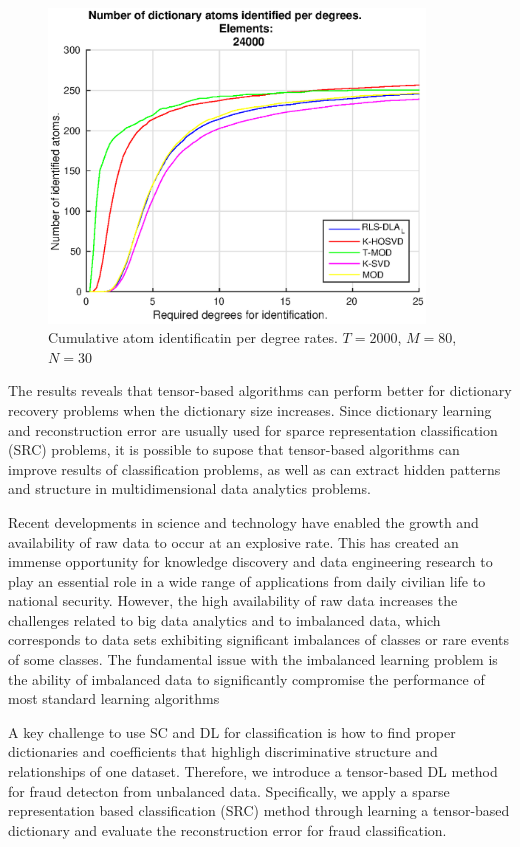 \begin{figure}[!htb]
	\centering 
	\includegraphics[width=10cm]{figures/5_20_2000_24000_100.eps}
	\caption{Cumulative atom identificatin per degree rates. $T=2000$, $M=80$, $N=30$}
	\label{fig:fig2}
\end{figure}

The results reveals that tensor-based algorithms can perform better for dictionary recovery problems when the dictionary size increases. Since dictionary learning and reconstruction error are usually used for sparce representation classification (SRC) problems, it is possible to supose that tensor-based algorithms can improve results of classification problems, as well as can extract hidden patterns and structure in multidimensional data analytics problems.

Recent developments in science and technology have enabled the growth and availability of raw data to occur at an explosive rate. This has created an immense opportunity for knowledge discovery and data engineering research to play an essential role in a wide range of applications from daily civilian life to national security. However, the high availability of raw data increases the challenges related to big data analytics and to imbalanced data, which corresponds to data sets exhibiting significant imbalances of classes or rare events of some classes. The fundamental issue with the imbalanced learning problem is the ability of imbalanced data to significantly compromise the performance of most standard learning algorithms

A key challenge to use SC and DL for classification is how to find proper dictionaries and coefficients that highligh discriminative structure and relationships of one dataset. Therefore, we introduce a tensor-based DL method for fraud detecton from unbalanced data. Specifically, we apply a sparse representation based classification (SRC) method through learning a tensor-based dictionary and evaluate the reconstruction error for fraud classification. 

